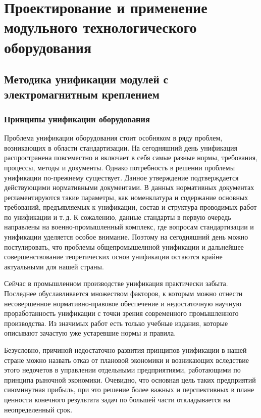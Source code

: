 \chapter{Проектирование и применение модульного технологического оборудования}\label{ch:ch2}

\section{Методика унификации модулей с электромагнитным креплением}

\subsection{Принципы унификации оборудования}

Проблема унификации оборудования стоит особняком в ряду проблем, возникающих в области стандартизации. На сегодняшний день унификация распространена повсеместно и включает в себя самые разные нормы, требования, процессы, методы и документы. Однако потребность в решении проблемы унификации по-прежнему существует. Данное утверждение подтверждается действующими нормативными документами. В данных нормативных документах регламентируются такие параметры, как номенклатура и содержание основных требований, предъявляемых к унификации, состав и структура проводимых работ по унификации и т.\,д. К сожалению, данные стандарты в первую очередь направлены на военно-промышленный комплекс, где вопросам стандартизации и унификации уделяется особое внимание. Поэтому на сегодняшний день можно постулировать, что проблемы общепромышелнной унификации и дальнейшее совершенствование теоретических основ унификации остаются крайне актуальными для нашей страны. 

Сейчас в промышленном производстве унификация практически забыта. Последнее обуславливается множеством факторов, к которым можно отнести несовершенное нормативно-правовое обеспечение и недостаточную научную проработанность унификации с точки зрения современного промышленного производства. Из значимых работ есть только учебные издания, которые описывают зачастую уже устаревшие нормы и правила. 

Безусловно, причиной недостаточно развития принципов унификации в нашей стране можно назвать отказ от плановой экономики и возникающих вследствие этого недочетов в управлении отдельными предприятиями, работающими по принципа рыночной экономики. Очевидно, что основная цель таких предприятий сиюминутная прибыль, при это решение более важных и перспективных в плане ценности конечного результата задач по большей части откладывается на неопределенный срок. 

